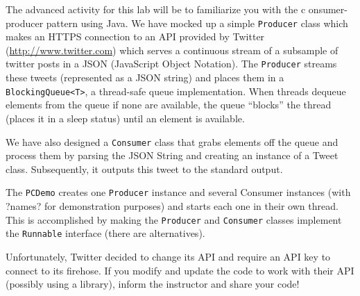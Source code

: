 \documentclass[12pt]{scrartcl}
\begin{document}
The advanced activity for this lab will be to familiarize you with the c
onsumer-producer pattern using Java.  We have mocked up a simple 
\texttt{Producer} class which makes an HTTPS connection to 
an API provided by Twitter (\url{http://www.twitter.com}) which serves 
a continuous stream of a subsample of twitter posts in a JSON 
(JavaScript Object Notation).  The \texttt{Producer} streams 
these tweets (represented as a JSON string) and places them in a 
\texttt{BlockingQueue<T>}, a thread-safe queue implementation.  
When threads dequeue elements from the queue if none are available, the 
queue ``blocks'' the thread (places it in a sleep status) until an 
element is available.

We have also designed a \texttt{Consumer} class that grabs 
elements off the queue and process them by parsing the JSON String 
and creating an instance of a Tweet class.  Subsequently, it outputs 
this tweet to the standard output.

The \texttt{PCDemo} creates one \texttt{Producer} 
instance and several Consumer instances (with ?names? for demonstration 
purposes) and starts each one in their own thread.  This is accomplished 
by making the \texttt{Producer} and \texttt{Consumer} 
classes implement the \texttt{Runnable} interface (there are 
alternatives).

Unfortunately, Twitter decided to change its API and require an 
API key to connect to its firehose.  If you modify and update the
code to work with their API (possibly using a library), inform
the instructor and share your code!
\end{document}
